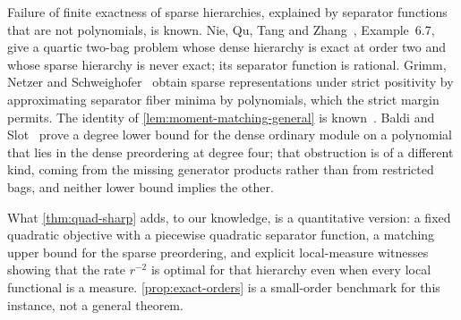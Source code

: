 \begin{remark}\label{rem:shp-prior}
Failure of finite exactness of sparse hierarchies, explained by separator
functions that are not polynomials, is known. Nie, Qu, Tang and
Zhang~\cite{nie2026-sparse-tightness}, Example~6.7, give a quartic two-bag
problem whose dense hierarchy is exact at order two and whose sparse
hierarchy is never exact; its separator function is rational. Grimm,
Netzer and Schweighofer~\cite{grimm2007-structured-sparsity} obtain sparse
representations under strict positivity by approximating separator fiber
minima by polynomials, which the strict margin permits. The identity of
\cref{lem:moment-matching-general} is known~\cite{han2018-local-moment-matching}.
Baldi and Slot~\cite{baldi2024-putinar-hypercube} prove a degree lower bound
for the dense ordinary module on a polynomial that lies in the dense
preordering at degree four; that obstruction is of a different kind,
coming from the missing generator products rather than from restricted
bags, and neither lower bound implies the other.

What \cref{thm:quad-sharp} adds, to our knowledge, is a quantitative
version: a fixed quadratic objective with a piecewise quadratic separator
function, a matching upper bound for the sparse preordering, and explicit
local-measure witnesses showing that the rate $r^{-2}$ is optimal for that
hierarchy even when every local functional is a measure.
\cref{prop:exact-orders} is a small-order benchmark for this instance, not
a general theorem.
\end{remark}
